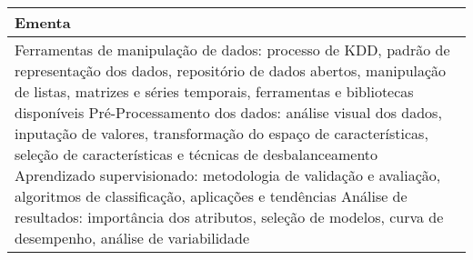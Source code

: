 \begin{quadro}[ht!]
\begin{tabular}{|p{3cm} p{2cm} p{3cm} p{2cm} p{3cm} p{2cm}|}
\multicolumn{6}{|p{15cm}|}{\cellcolor{blue1} Ementa} \\\hline
\hline\multicolumn{6}{|p{15cm}|}{\scriptsize Ferramentas de manipulação de dados: processo de KDD, padrão de representação dos dados, repositório de dados abertos, manipulação de listas, matrizes e séries temporais, ferramentas e bibliotecas disponíveis Pré-Processamento dos dados: análise visual dos dados, inputação de valores,  transformação do espaço de características, seleção de características e técnicas de desbalanceamento Aprendizado supervisionado: metodologia de validação e avaliação, algoritmos de classificação, aplicações e tendências Análise de resultados: importância dos atributos, seleção de modelos, curva de desempenho, análise de variabilidade}\\\hline
\hline
	\end{tabular}
\end{quadro}
